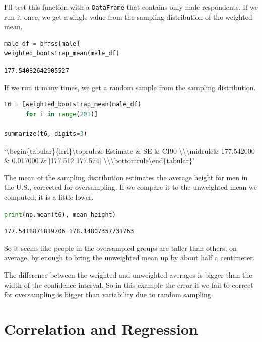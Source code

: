 I'll test this function with a \passthrough{\lstinline!DataFrame!} that
contains only male respondents. If we run it once, we get a single value
from the sampling distribution of the weighted mean.

\begin{lstlisting}[language=Python,style=source]
male_df = brfss[male]
weighted_bootstrap_mean(male_df)
\end{lstlisting}

\begin{lstlisting}[style=output]
177.54082642905527
\end{lstlisting}

If we run it many times, we get a random sample from the sampling
distribution.

\begin{lstlisting}[language=Python,style=source]
t6 = [weighted_bootstrap_mean(male_df) 
      for i in range(201)]

summarize(t6, digits=3)
\end{lstlisting}

`\textbackslash begin\{tabular\}\{lrrl\}\n\textbackslash toprule\n \&
Estimate \& SE \& CI90
\textbackslash\textbackslash{}\n\textbackslash midrule\n \& 177.542000
\& 0.017000 \& {[}177.512 177.574{]}
\textbackslash\textbackslash{}\n\textbackslash bottomrule\n\textbackslash end\{tabular\}\n'

The mean of the sampling distribution estimates the average height for
men in the U.S., corrected for oversampling. If we compare it to the
unweighted mean we computed, it is a little lower.

\begin{lstlisting}[language=Python,style=source]
print(np.mean(t6), mean_height)
\end{lstlisting}

\begin{lstlisting}[style=output]
177.5418871819706 178.14807357731763
\end{lstlisting}

So it seems like people in the oversampled groups are taller than
others, on average, by enough to bring the unweighted mean up by about
half a centimeter.

The difference between the weighted and unweighted averages is bigger
than the width of the confidence interval. So in this example the error
if we fail to correct for oversampling is bigger than variability due to
random sampling.

\hypertarget{correlation-and-regression}{%
\section{Correlation and Regression}\label{correlation-and-regression}}

